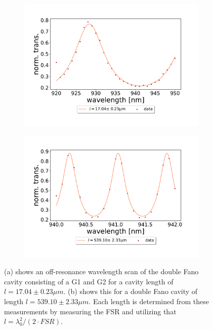 \begin{figure}[h!]
    \centering
    \begin{subfigure}[b]{0.49\textwidth}
        \centering
        \includegraphics[width=\textwidth]{figures/results/double fano fits/30um_M3:M5_FSR_scan.pdf}
        \caption{}
        \label{fig:short_double_fano_FSR}
    \end{subfigure}
    \begin{subfigure}[b]{0.49\textwidth}
        \centering
        \includegraphics[width=\textwidth]{figures/results/double fano fits/550um_M3:M5_FSR_scan.pdf}
        \caption{}
        \label{fig:long_double_fano_FSR}
    \end{subfigure}
    \caption{(a) shows an off-resonance wavelength scan of the double Fano cavity consisting of a G1 and G2 for a cavity length of $l = 17.04 \pm 0.23 \mu m$. (b) shows this for a double Fano cavity of length $l = 539.10 \pm 2.33 \mu m$. Each length is determined from these measurements by measuring the FSR and utilizing that $l = \lambda_0^2/(2\cdot FSR)$.}
    \label{fig:double_fano_fsr_scans}
\end{figure}

